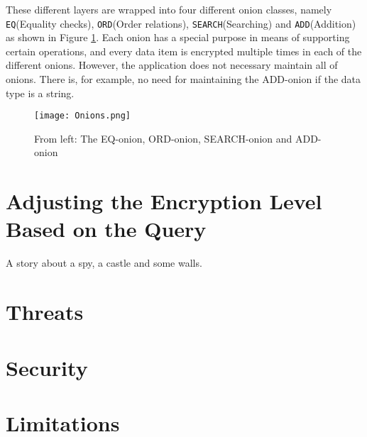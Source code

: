 
These different layers are wrapped into four different onion classes, namely \texttt{EQ}(Equality checks), \texttt{ORD}(Order relations), \texttt{SEARCH}(Searching) and \texttt{ADD}(Addition) as shown in Figure \ref{cryptdb_onions}. Each onion has a special purpose in means of supporting certain operations, and every data item is encrypted multiple times in each of the different onions. However, the application does not necessary maintain all of onions. There is, for example, no need for maintaining the ADD-onion if the data type is a string. 

\begin{figure}[ht]
	\texttt{[image: Onions.png]}
	\caption{From left: The EQ-onion, ORD-onion, SEARCH-onion and ADD-onion}
	\label{cryptdb_onions}
\end{figure}


\section{Adjusting the Encryption Level Based on the Query}
\label{adjust_enc_level}

A story about a spy, a castle and some walls.

\section{Threats}

\section{Security}

\section{Limitations}
